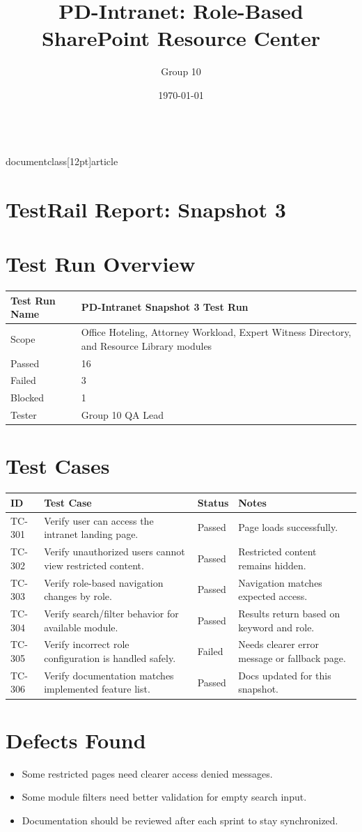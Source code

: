 \\documentclass[12pt]{article}
\title{PD-Intranet: Role-Based SharePoint Resource Center}
\author{Group 10}
\date{\today}
\begin{document}
\maketitle
\tableofcontents
\newpage

\section{TestRail Report: Snapshot 3}
\section{Test Run Overview}
\begin{longtable}{|p{2in}|p{4in}|}\hline
Test Run Name & PD-Intranet Snapshot 3 Test Run \\ \hline
Scope & Office Hoteling, Attorney Workload, Expert Witness Directory, and Resource Library modules \\ \hline
Passed & 16 \\ \hline
Failed & 3 \\ \hline
Blocked & 1 \\ \hline
Tester & Group 10 QA Lead \\ \hline
\end{longtable}

\section{Test Cases}
\begin{longtable}{|p{.8in}|p{2.2in}|p{1in}|p{2in}|}\hline
ID & Test Case & Status & Notes \\ \hline
TC-301 & Verify user can access the intranet landing page. & Passed & Page loads successfully. \\ \hline
TC-302 & Verify unauthorized users cannot view restricted content. & Passed & Restricted content remains hidden. \\ \hline
TC-303 & Verify role-based navigation changes by role. & Passed & Navigation matches expected access. \\ \hline
TC-304 & Verify search/filter behavior for available module. & Passed & Results return based on keyword and role. \\ \hline
TC-305 & Verify incorrect role configuration is handled safely. & Failed & Needs clearer error message or fallback page. \\ \hline
TC-306 & Verify documentation matches implemented feature list. & Passed & Docs updated for this snapshot. \\ \hline
\end{longtable}

\section{Defects Found}
\begin{itemize}
\item Some restricted pages need clearer access denied messages.
\item Some module filters need better validation for empty search input.
\item Documentation should be reviewed after each sprint to stay synchronized.
\end{itemize}
\end{document}
